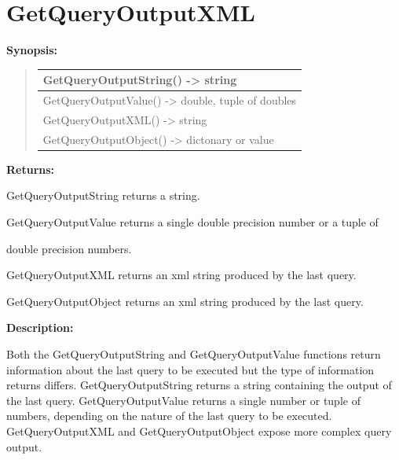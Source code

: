 \documentclass[letterpaper,10pt,english]{sphinxmanual}
\begin{document}
\section{GetQueryOutputXML}
\label{functions:getqueryoutputxml}
\begin{DUlineblock}{0em}
\item[] \textbf{Synopsis:}
\end{DUlineblock}
\begin{quote}

\begin{tabulary}{\linewidth}{|L|}
\hline

GetQueryOutputString() -\textgreater{} string
\\
\hline
GetQueryOutputValue() -\textgreater{} double, tuple of doubles
\\
\hline
GetQueryOutputXML() -\textgreater{} string
\\
\hline
GetQueryOutputObject() -\textgreater{} dictonary or value
\\
\hline\end{tabulary}

\end{quote}

\begin{DUlineblock}{0em}
\item[] 
\item[] \textbf{Returns:}
\item[] GetQueryOutputString returns a string.
\item[] GetQueryOutputValue returns a single double precision number or a tuple of
\item[] double precision numbers.
\item[] GetQueryOutputXML returns an xml string produced by the last query.
\item[] GetQueryOutputObject returns an xml string produced by the last query.
\item[] 
\item[] \textbf{Description:}
\item[] Both the GetQueryOutputString and GetQueryOutputValue functions return
information about the last query to be executed but the type of information
returns differs. GetQueryOutputString returns a string containing the
output of the last query. GetQueryOutputValue returns a single number or
tuple of numbers, depending on the nature of the last query to be executed.
GetQueryOutputXML and GetQueryOutputObject expose more complex query output.
\end{DUlineblock}
\end{document}
